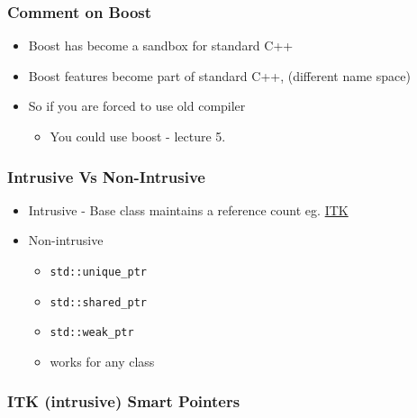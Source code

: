 \subsubsection{Comment on Boost}\label{comment-on-boost}

\begin{itemize}
\itemsep1pt\parskip0pt
\item
  Boost has become a sandbox for standard C++
\item
  Boost features become part of standard C++, (different name space)
\item
  So if you are forced to use old compiler

  \begin{itemize}
  \itemsep1pt\parskip0pt
  \item
    You could use boost - lecture 5.
  \end{itemize}
\end{itemize}

\subsubsection{Intrusive Vs
Non-Intrusive}\label{intrusive-vs-non-intrusive}

\begin{itemize}
\itemsep1pt\parskip0pt
\item
  Intrusive - Base class maintains a reference count eg.
  \href{http://www.itk.org}{ITK}
\item
  Non-intrusive

  \begin{itemize}
  \itemsep1pt\parskip0pt
  \item
    \texttt{std::unique\_ptr}
  \item
    \texttt{std::shared\_ptr}
  \item
    \texttt{std::weak\_ptr}
  \item
    works for any class
  \end{itemize}
\end{itemize}

\subsubsection{ITK (intrusive) Smart
Pointers}\label{itk-intrusive-smart-pointers}

